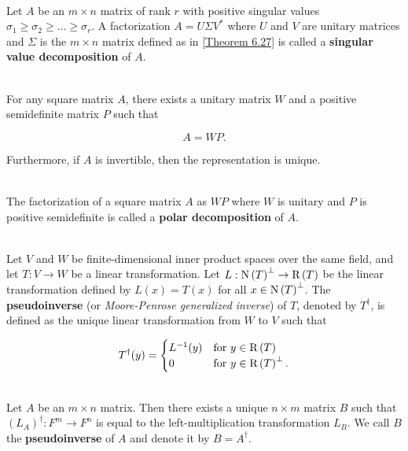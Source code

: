 \begin{definition}
	\hfill\\
	Let $A$ be an $m \times n$ matrix of rank $r$ with positive singular values $\sigma_1 \geq \sigma_2 \geq \dots \geq \sigma_r$. A factorization $A = U\Sigma V^*$ where $U$ and $V$ are unitary matrices and $\Sigma$ is the $m \times n$ matrix defined as in \autoref{Theorem 6.27} is called a \textbf{singular value decomposition} of $A$.
\end{definition}

\begin{theorem}
	\hfill\\
	For any square matrix $A$, there exists a unitary matrix $W$ and a positive semidefinite matrix $P$ such that

	\[A = WP.\]

	Furthermore, if $A$ is invertible, then the representation is unique.
\end{theorem}

\begin{definition}
	\hfill\\
	The factorization of a square matrix $A$ as $WP$ where $W$ is unitary and $P$ is positive semidefinite is called a \textbf{polar decomposition} of $A$.
\end{definition}

\begin{definition}
	\hfill\\
	Let $V$ and $W$ be finite-dimensional inner product spaces over the same field, and let $T: V \to W$ be a linear transformation. Let $L: \text{N}\left(T\right)^\perp \to \text{R}\left(T\right)$ be the linear transformation defined by $L(x) = T(x)$ for all $x \in \text{N}\left(T\right)^\perp$. The \textbf{pseudoinverse} (or \textit{Moore-Penrose generalized inverse}) of $T$, denoted by $T^\dagger$, is defined as the unique linear transformation from $W$ to $V$ such that

	\[T^\dagger(y) = \begin{cases}
			L^{-1}(y) & \text{for}\ y \in \text{R}\left(T\right)        \\
			0         & \text{for}\ y \in \text{R}\left(T\right)^\perp.
		\end{cases}\]
\end{definition}

\begin{definition}
	\hfill\\
	Let $A$ be an $m \times n$ matrix. Then there exists a unique $n \times m$ matrix $B$ such that $(L_A)^\dagger: F^m \to F^n$ is equal to the left-multiplication transformation $L_B$. We call $B$ the \textbf{pseudoinverse} of $A$ and denote it by $B = A^\dagger$.
\end{definition}

